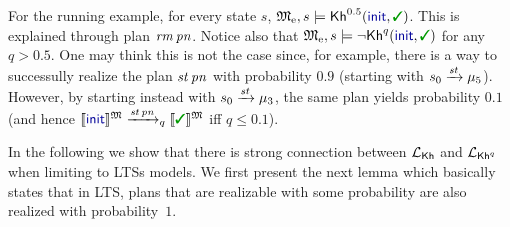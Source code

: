 \begin{example}\label{ex:running:pkh}
  For the running example, for every state $s$,
  $\modelex, s \models \kh^{0.5}(\init,\goal)$.
  This is explained through plan $\mathit{rm}\,\mathit{pn}$.
  Notice also that $\modelex, s \models \neg \kh^q(\init,\goal)$ for
  any $q>0.5$. One may think this is not the case since, for example,
  there is a way to successully realize the plan $\mathit{st}\,\mathit{pn}$
  with probability $0.9$ (starting with $s_0\xrightarrow{\mathit{st}}\mu_5$).
  However, by starting instead with $s_0\xrightarrow{\mathit{st}}\mu_3$, the
  same plan yields probability $0.1$ (and hence
  $\truthset{\model}{\init}\reach{\stairs\,\panic}_q\truthset{\model}{\goal}$
  iff $q\leq 0.1$).
\end{example}

In the following we show that there is strong connection between
${\mathcal{L}_{{\mathsf{Kh}}}}$ and ${\mathcal{L}_{{\mathsf{Kh}}^q}}$ when limiting to LTSs models. We first present
the next lemma which basically states that in LTS, plans that are
realizable with some probability are also realized with
probability~$1$.


